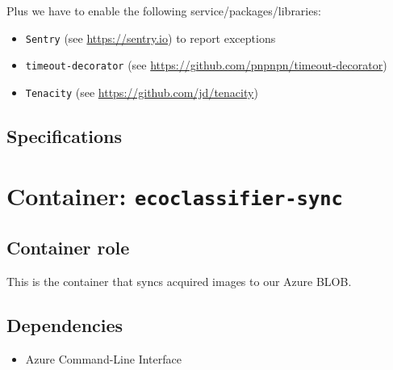 Plus we have to enable the following service/packages/libraries:

\begin{itemize}
    \item \texttt{Sentry} (see \url{https://sentry.io}) to report exceptions
    \item \texttt{timeout-decorator} (see \url{https://github.com/pnpnpn/timeout-decorator})
    \item \texttt{Tenacity} (see \url{https://github.com/jd/tenacity})
\end{itemize}


\subsection{Specifications}




\section{Container: \texttt{ecoclassifier-sync}}

\subsection{Container role}

This is the container that syncs acquired images to our Azure BLOB.

\subsection{Dependencies}

\begin{itemize}
    \item Azure Command-Line Interface
\end{itemize}
